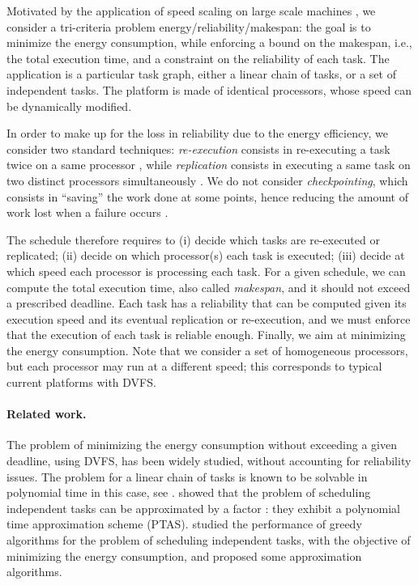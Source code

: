 \documentclass[a4paper]{article}
\theoremstyle{plain}
\theoremstyle{definition}
\theoremstyle{remark}
\begin{document}
Motivated by the application of speed scaling on large scale machines
\cite{Oliner04}, we consider a tri-criteria problem
energy/reliability/makespan: the goal is to minimize the energy
consumption, while enforcing a bound on the makespan, i.e., the total
execution time, and a constraint on the reliability of each task.  The
application is a particular task graph, either a linear chain of
tasks, or a set of independent tasks. The platform is made of
identical processors, whose speed can be dynamically modified. 

In order to make up for the loss in reliability due to the energy
efficiency, we consider two standard techniques: \emph{re-execution}
consists in re-executing a task twice on a same processor
\cite{Zhu04EEM,Zhu06}, while \emph{replication} consists in executing
a same task on two distinct processors simultaneously
\cite{Assayad11}. We do not consider \emph{checkpointing}, which
consists in ``saving'' the work done at some points, hence reducing
the amount of work lost when a failure occurs
\cite{Melhem03CP,Zhang03CP}.
 
The schedule therefore requires to (i) decide which tasks are
re-executed or replicated; (ii) decide on which processor(s) each task
is executed; (iii) decide at which speed each processor is processing
each task. For a given schedule, we can compute the total execution
time, also called {\em makespan}, and it should not exceed a
prescribed deadline. Each task has a reliability that can be computed
given its execution speed and its eventual replication or
re-execution, and we must enforce that the execution of each task is
reliable enough.  Finally, we aim at minimizing the energy
consumption.  Note that we consider a set of homogeneous processors,
but each processor may run at a different speed; this corresponds to
typical current platforms with DVFS. 


\paragraph{Related work.}
The problem of minimizing the energy consumption without exceeding a
given deadline, using DVFS, has been widely studied, without
accounting for reliability issues.  The problem for a linear chain of
tasks is known to be solvable in polynomial time in this case, see
\cite{aupy12ccpe}. \cite{Alon97} showed that the problem of
scheduling independent tasks can be approximated by a factor
: they exhibit a polynomial time approximation scheme
(PTAS). \cite{RenaudGoudGreedy} studied the performance of greedy
algorithms for the problem of scheduling independent tasks, with the
objective of minimizing the energy consumption, and proposed some
approximation algorithms.
\end{document}
